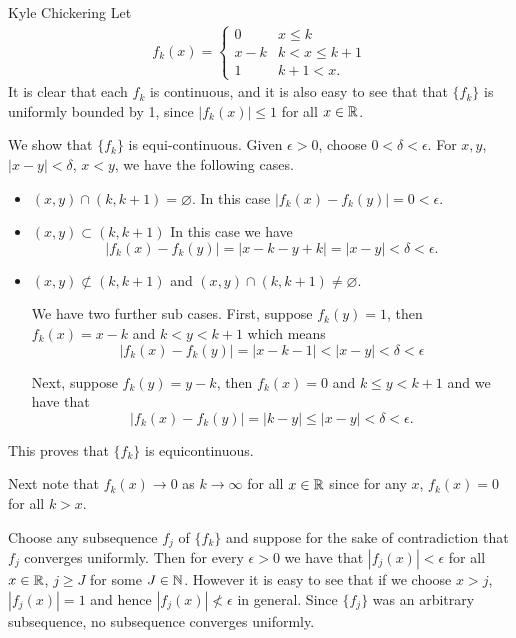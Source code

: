 

\begin{solution}{Kyle Chickering}
	Let
	\begin{align*}
		f_k(x) = \begin{cases}
			0 & x \leqslant k \\
			x-k & k<x\leqslant k+1 \\
			1 & k + 1 < x.
		\end{cases}
	\end{align*}
	It is clear that each $f_k$ is continuous, and it is also easy to see that that $\{f_k\}$ is uniformly bounded by 1, since $|f_k(x)|\leqslant 1$ for all $x\in \mathbb{R}$.

	We show that $\{f_k\}$ is equi-continuous.
    Given $\epsilon > 0$, choose $0 < \delta < \epsilon$. For $x, y$, $|x-y|<\delta$, $x < y$, we have the following cases.
	\begin{itemize}
            \item 
                $(x, y)\cap (k, k+1) = \varnothing$.
                In this case $|f_k(x)-f_k(y)|=0<\epsilon$.

            \item 
                $(x,y)\subset (k, k+1)$
                In this case we have
                \[ |f_k(x)-f_k(y)|=|x-k-y+k| = |x-y|<\delta < \epsilon. \]

            \item 
                $(x,y) \not\subset (k, k+1)$ and $(x,y)\cap (k, k+1)\ne \varnothing$.

                We have two further sub cases. First, suppose $f_k(y)=1$, then $f_k(x)=x-k$ and $k<y<k+1$ which means
                \[ |f_k(x)-f_k(y)|=|x-k-1| < |x-y| < \delta < \epsilon \]

                Next, suppose $f_k(y)=y-k$, then $f_k(x)=0$ and $k \leqslant y < k+1$ and we have that
                \[ |f_k(x)-f_k(y)| = |k-y| \leqslant |x-y|<\delta < \epsilon. \]
    \end{itemize}
	This proves that $\{f_k\}$ is equicontinuous.

	Next note that $f_k(x)\rightarrow 0$ as $k\rightarrow \infty$ for all $x\in \mathbb{R}$ since for any $x$, $f_k(x)=0$ for all $k>x$.

	Choose any subsequence $f_j$ of $\{f_k\}$ and suppose for the sake of contradiction that $f_j$ converges uniformly.
    Then for every $\epsilon > 0$ we have that $|f_j(x)|<\epsilon$ for all $x\in \mathbb{R}$, $j\geqslant J$ for some $J\in \mathbb{N}$.
    However it is easy to see that if we choose $x>j$, $|f_j(x)|=1$ and hence $|f_j(x)|\not < \epsilon$ in general.
    Since $\{f_j\}$ was an arbitrary subsequence, no subsequence converges uniformly.
\end{solution}


